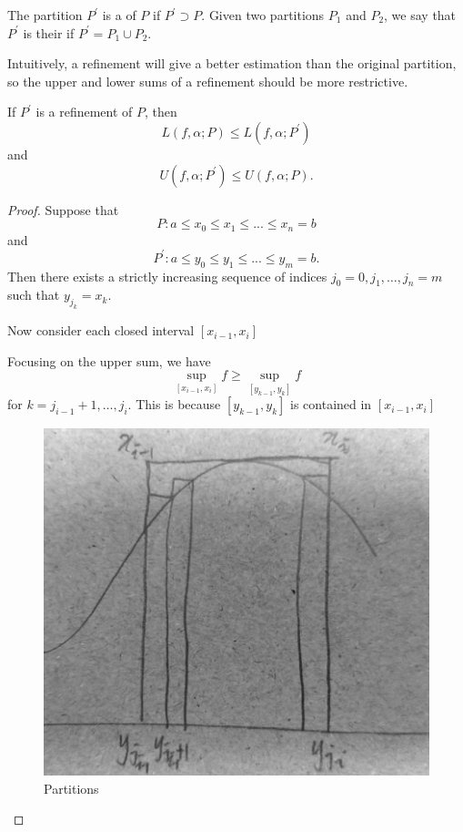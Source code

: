 \begin{definition}
The partition $P^\prime$ is a  of $P$ if $P^\prime\supset P$. Given two partitions $P_1$ and $P_2$, we say that $P^\prime$ is their  if $P^\prime=P_1\cup P_2$.
\end{definition}

Intuitively, a refinement will give a better estimation than the original partition, so the upper and lower sums of a refinement should be more restrictive.

\begin{proposition}
If $P^\prime$ is a refinement of $P$, then
\[ L(f,\alpha;P)\le L(f,\alpha;P^\prime) \]
and
\[ U(f,\alpha;P^\prime)\le U(f,\alpha;P). \]
\end{proposition}

\begin{proof}
Suppose that
\[ P: a\le x_0\le x_1\le ...\le x_n=b \]
and
\[ P^\prime: a\le y_0\le y_1\le ...\le y_m=b. \]
Then there exists a strictly increasing sequence of indices $j_0=0,j_1,\dots,j_n=m$ such that $y_{j_k}=x_k$.

Now consider each closed interval $[x_{i-1},x_i]$

Focusing on the upper sum, we have
\[ \sup_{[x_{i-1},x_i]} f \ge \sup_{[y_{k-1},y_k]} f \]
for $k=j_{i-1}+1,\dots,j_i$. 
This is because $[y_{k-1},y_k]$ is contained in $[x_{i-1},x_i]$

\begin{figure}[H]
    \centering
    \includegraphics[width=0.5\linewidth]{images/RSintegral-partitions.png}
    \caption{Partitions}
\end{figure}


\end{proof}
